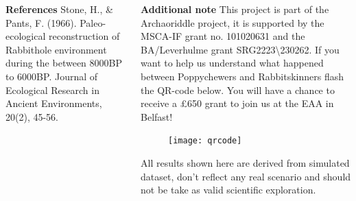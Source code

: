 \documentclass[final]{beamer}
\begin{document}
\begin{frame}[t]
\begin{columns}[t]
        \begin{block}{\textbf{References}}
            Stone, H., \& Pants, F. (1966). Paleo-ecological reconstruction of Rabbithole environment during the between 8000BP to 6000BP. Journal of Ecological Research in Ancient Environments, 20(2), 45-56.
        \end{block}
    \begin{block}{\textbf{Additional note}}
        \small
        This project is part of the Archaoriddle project, it is supported by the MSCA-IF grant no. 101020631 and the BA/Leverhulme grant SRG2223\textbackslash230262. If you want to help us understand what happened between Poppychewers and Rabbitskinners flash the QR-code below. You will have a chance to receive a £650 grant to join us at the EAA in Belfast! 
            \begin{figure}
                \texttt{[image: qrcode]}
            \end{figure}
            {\tiny  All results shown here are derived from simulated dataset, don't reflect any real scenario and should not be take as valid scientific exploration.\\
            }
        \end{block}

    \end{columns}

\end{frame}
\end{document}
